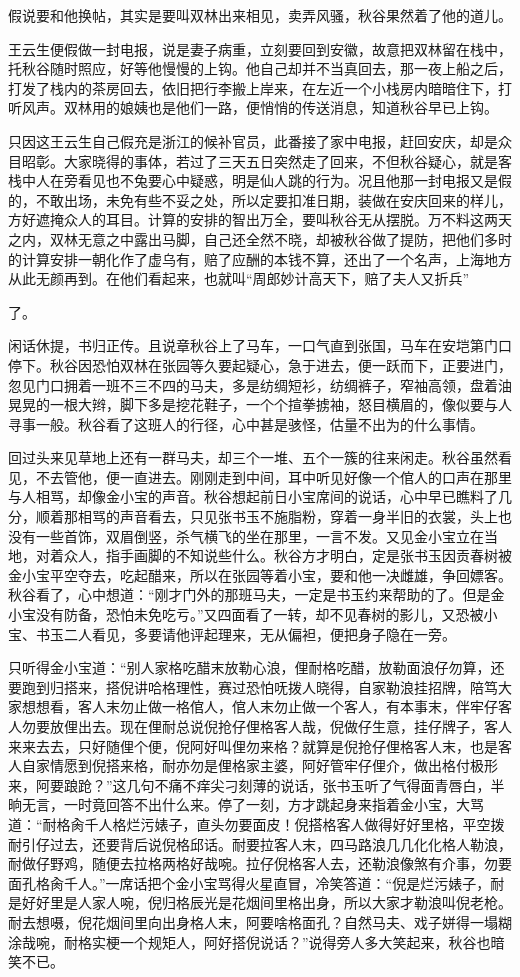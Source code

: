 \documentclass[12pt,UTF8]{ctexbook}
\begin{document}
{{{假说要和他换帖，其实是要叫双林出来相见，卖弄风骚，秋谷果然着了他的道儿。

王云生便假做一封电报，说是妻子病重，立刻要回到安徽，故意把双林留在栈中，托秋谷随时照应，好等他慢慢的上钩。他自己却并不当真回去，那一夜上船之后，打发了栈内的茶房回去，依旧把行李搬上岸来，在左近一个小栈房内暗暗住下，打听风声。双林用的娘姨也是他们一路，便悄悄的传送消息，知道秋谷早已上钩。

只因这王云生自己假充是浙江的候补官员，此番接了家中电报，赶回安庆，却是众目昭彰。大家晓得的事体，若过了三天五日突然走了回来，不但秋谷疑心，就是客栈中人在旁看见也不兔要心中疑惑，明是仙人跳的行为。况且他那一封电报又是假的，不敢出场，未免有些不妥之处，所以定要扣准日期，装做在安庆回来的样儿，方好遮掩众人的耳目。计算的安排的智出万全，要叫秋谷无从摆脱。万不料这两天之内，双林无意之中露出马脚，自己还全然不晓，却被秋谷做了提防，把他们多时的计算安排一朝化作了虚乌有，赔了应酬的本钱不算，还出了一个名声，上海地方从此无颜再到。在他们看起来，也就叫“周郎妙计高天下，赔了夫人又折兵”

了。

闲话休提，书归正传。且说章秋谷上了马车，一口气直到张国，马车在安垲第门口停下。秋谷因恐怕双林在张园等久要起疑心，急于进去，便一跃而下，正要进门，忽见门口拥着一班不三不四的马夫，多是纺绸短衫，纺绸裤子，窄袖高领，盘着油晃晃的一根大辫，脚下多是挖花鞋子，一个个揎拳掳袖，怒目横眉的，像似要与人寻事一般。秋谷看了这班人的行径，心中甚是骇怪，估量不出为的什么事情。

回过头来见草地上还有一群马夫，却三个一堆、五个一簇的往来闲走。秋谷虽然看见，不去管他，便一直进去。刚刚走到中间，耳中听见好像一个倌人的口声在那里与人相骂，却像金小宝的声音。秋谷想起前日小宝席间的说话，心中早已瞧料了几分，顺着那相骂的声音看去，只见张书玉不施脂粉，穿着一身半旧的衣裳，头上也没有一些首饰，双眉倒竖，杀气横飞的坐在那里，一言不发。又见金小宝立在当地，对着众人，指手画脚的不知说些什么。秋谷方才明白，定是张书玉因贡春树被金小宝平空夺去，吃起醋来，所以在张园等着小宝，要和他一决雌雄，争回嫖客。秋谷看了，心中想道：“刚才门外的那班马夫，一定是书玉约来帮助的了。但是金小宝没有防备，恐怕未免吃亏。”又四面看了一转，却不见春树的影儿，又恐被小宝、书玉二人看见，多要请他评起理来，无从偏袒，便把身子隐在一旁。

只听得金小宝道：“别人家格吃醋末放勒心浪，俚耐格吃醋，放勒面浪仔勿算，还要跑到归搭来，搭倪讲哈格理性，赛过恐怕呒拨人晓得，自家勒浪挂招牌，陪笃大家想想看，客人末勿止做一格倌人，倌人末勿止做一个客人，有本事末，伴牢仔客人勿要放俚出去。现在俚耐总说倪抢仔俚格客人哉，倪做仔生意，挂仔牌子，客人来来去去，只好随俚个便，倪阿好叫俚勿来格？就算是倪抢仔俚格客人末，也是客人自家情愿到倪搭来格，耐亦勿是俚格家主婆，阿好管牢仔俚介，做出格付极形来，阿要踉跄？”这几句不痛不痒尖刁刻薄的说话，张书玉听了气得面青唇白，半晌无言，一时竟回答不出什么来。停了一刻，方才跳起身来指着金小宝，大骂道：“耐格肏千人格烂污婊子，直头勿要面皮！倪搭格客人做得好好里格，平空拨耐引仔过去，还要背后说倪格邱话。耐要拉客人末，四马路浪几几化化格人勒浪，耐做仔野鸡，随便去拉格两格好哉啘。拉仔倪格客人去，还勒浪像煞有介事，勿要面孔格肏千人。”一席话把个金小宝骂得火星直冒，冷笑答道：“倪是烂污婊子，耐是好好里是人家人啘，倪归格辰光是花烟间里格出身，所以大家才勒浪叫倪老枪。耐去想嗫，倪花烟间里向出身格人末，阿要啥格面孔？自然马夫、戏子姘得一塌糊涂哉啘，耐格实梗一个规矩人，阿好搭倪说话？”说得旁人多大笑起来，秋谷也暗笑不已。

}}}
\end{document}

